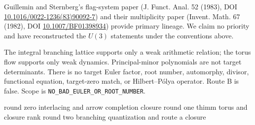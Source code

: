 \documentclass[10pt]{article}
\begin{document}
Guillemin and Sternberg's flag-system paper (J. Funct. Anal. 52 (1983), DOI
\href{https://doi.org/10.1016/0022-1236(83)90092-7}{10.1016/0022-1236(83)90092-7}) and their multiplicity paper (Invent. Math. 67 (1982), DOI
\href{https://doi.org/10.1007/BF01398934}{10.1007/BF01398934}) provide primary lineage.  We claim no priority and have reconstructed the $U(3)$ statements under the conventions above.

The integral branching lattice supports only a weak arithmetic relation; the torus flow supports only weak dynamics.  Principal-minor polynomials are not target determinants.  There is no target Euler factor, root number, automorphy, divisor, functional equation, target-zero match, or Hilbert--Pólya operator.  Route B is false.  Scope is \texttt{NO\_BAD\_EULER\_OR\_ROOT\_NUMBER}.
\fi

\vfill\noindent\footnotesize
\ifcase\CRevisionRound
round zero interlacing and arrow completion closure
\or round one thimm torus and closure rank
\else round two branching quantization and route a closure
\fi
\end{document}
